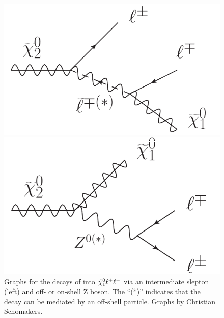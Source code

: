 \begin{figure}[htbp]
\centering
\begin{minipage}[t]{0.49\textwidth}
  \includegraphics[width=\textwidth]{plots/THEO/FeynmanGraph_slepton.pdf}
\end{minipage}
\begin{minipage}[t]{0.49\textwidth}
\includegraphics[width=\textwidth]{plots/THEO/FeynmanGraph_Z_decay.pdf}
\end{minipage}
\caption{Graphs for the decays of \secondchi into ${\tilde{\chi}^0_1}\ell^+\ell^-$ via an intermediate slepton (left) and off- or on-shell Z boson. The ``(*)'' indicates that the decay can be mediated by an off-shell particle. Graphs by Christian Schomakers.}
\label{fig:edgeFeyn}
\end{figure}

